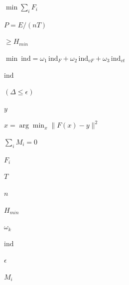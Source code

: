 
$\min \sum_i F_i$

$P=E/(nT)$

$\ge H_{min}$

$\min\ \mathrm{ind}=\omega_1\,\mathrm{ind}_F+\omega_2\,\mathrm{ind}_{vF}+\omega_3\,\mathrm{ind}_{vt}$

$\mathrm{ind}$

$(\Delta\le\epsilon)$

$y$

$\hat x=\arg\min_x\|F(x)-y\|^2$

$\sum_i M_i=0$

$F_i$

$T$

$n$

$H_{min}$

$\omega_k$

$\mathrm{ind}$

$\epsilon$

$M_i$
